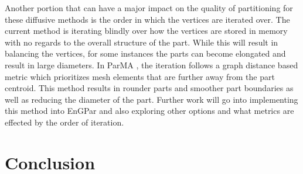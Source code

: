 \documentclass[a4paper]{article}
\begin{document}
Another portion that can have a major impact on the quality of partitioning for these diffusive methods is the order in which the vertices are iterated over. The current method is iterating blindly over how the vertices are stored in memory with no regards to the overall structure of the part. While this will result in balancing the vertices, for some instances the parts can become elongated and result in large diameters. In ParMA \cite{SmithParma2015}, the iteration follows a graph distance based metric which prioritizes mesh elements that are further away from the part centroid. This method results in rounder parts and smoother part boundaries as well as reducing the diameter of the part. Further work will go into implementing this method into EnGPar and also exploring other options and what metrics are effected by the order of iteration.



\section{Conclusion}

\newpage 

%
%
\end{document}
